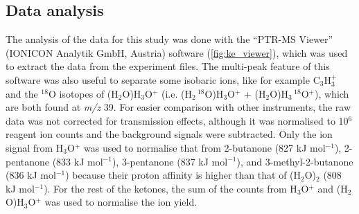 \subsection{Data analysis}
The analysis of the data for this study was done with the “PTR-MS Viewer” (IONICON Analytik GmbH, Austria) software (\autoref{fig:ke_viewer}), which was used to extract the data from the experiment files. 
The multi-peak feature of this software was also useful to separate some isobaric ions, like for example C$_3$H$_3^+$ and the $^{18}$O isotopes of (H$_2$O)H$_3$O$^+$ (i.e. (H$_2\,^{18}$O)H$_3$O$^+$ + (H$_2$O)H$_3\,^{18}$O$^+$), which are both found  at \textit{m/z} 39.
For easier comparison with other instruments, the raw data was not corrected for transmission effects, although it was normalised to 10$^6$ reagent ion counts and the background signals were subtracted. 
Only the ion signal from H$_3$O$^+$ was used to normalise that from  2-butanone (827 kJ mol$^{-1}$), 2-pentanone (833 kJ mol$^{-1}$), 3-pentanone (837 kJ mol$^{-1}$), and 3-methyl-2-butanone (836 kJ mol$^{-1}$) because their proton affinity is higher than that of (H$_2$O)$_2$ (808 kJ mol$^{-1}$). 
For the rest of the ketones, the sum of the counts from H$_3$O$^+$ and (H$_2$O)H$_3$O$^+$ was used to normalise the ion yield.





